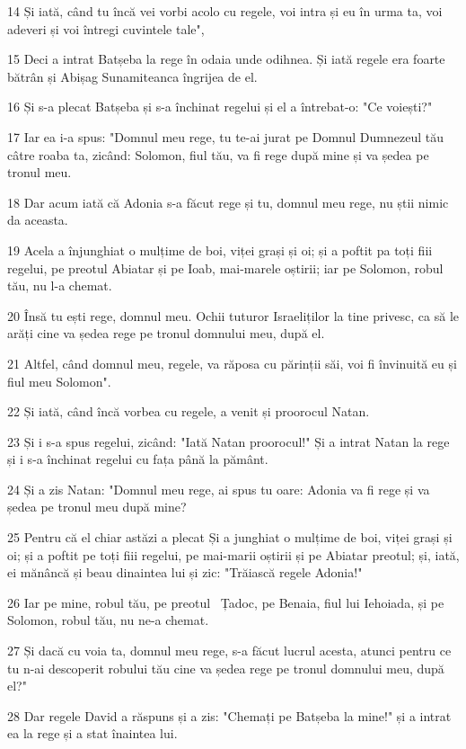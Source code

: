 \par 14 Și iată, când tu încă vei vorbi acolo cu regele, voi intra și eu în urma ta, voi adeveri și voi întregi cuvintele tale",
\par 15 Deci a intrat Batșeba la rege în odaia unde odihnea. Și iată regele era foarte bătrân și Abișag Sunamiteanca îngrijea de el.
\par 16 Și s-a plecat Batșeba și s-a închinat regelui și el a întrebat-o: "Ce voiești?"
\par 17 Iar ea i-a spus: "Domnul meu rege, tu te-ai jurat pe Domnul Dumnezeul tău câtre roaba ta, zicând: Solomon, fiul tău, va fi rege după mine și va ședea pe tronul meu.
\par 18 Dar acum iată că Adonia s-a făcut rege și tu, domnul meu rege, nu știi nimic da aceasta.
\par 19 Acela a înjunghiat o mulțime de boi, viței grași și oi; și a poftit pa toți fiii regelui, pe preotul Abiatar și pe Ioab, mai-marele oștirii; iar pe Solomon, robul tău, nu l-a chemat.
\par 20 Însă tu ești rege, domnul meu. Ochii tuturor Israeliților la tine privesc, ca să le arăți cine va ședea rege pe tronul domnului meu, după el.
\par 21 Altfel, când domnul meu, regele, va răposa cu părinții săi, voi fi învinuită eu și fiul meu Solomon".
\par 22 Și iată, când încă vorbea cu regele, a venit și proorocul Natan.
\par 23 Și i s-a spus regelui, zicând: "Iată Natan proorocul!" Și a intrat Natan la rege și i s-a închinat regelui cu fața până la pământ.
\par 24 Și a zis Natan: "Domnul meu rege, ai spus tu oare: Adonia va fi rege și va ședea pe tronul meu după mine?
\par 25 Pentru că el chiar astăzi a plecat Și a junghiat o mulțime de boi, viței grași și oi; și a poftit pe toți fiii regelui, pe mai-marii oștirii și pe Abiatar preotul; și, iată, ei mănâncă și beau dinaintea lui și zic: "Trăiască regele Adonia!"
\par 26 Iar pe mine, robul tău, pe preotul  Țadoc, pe Benaia, fiul lui Iehoiada, și pe Solomon, robul tău, nu ne-a chemat.
\par 27 Și dacă cu voia ta, domnul meu rege, s-a făcut lucrul acesta, atunci pentru ce tu n-ai descoperit robului tău cine va ședea rege pe tronul domnului meu, după el?"
\par 28 Dar regele David a răspuns și a zis: "Chemați pe Batșeba la mine!" și a intrat ea la rege și a stat înaintea lui.
